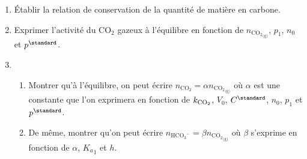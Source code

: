 \documentclass[a4paper,french,bookmarks]{article}
\begin{document}
    \begin{enumerate}
        \item Établir la relation de conservation de la quantité de matière en carbone.
        
        \boxansconc{
            \[ n_0 = n_{{\mathrm C\mathrm O_2}_\text{(g)}} + n_{{\mathrm C\mathrm O_2}} + n_{{\mathrm H\mathrm C\mathrm O_3}^-} + n_{{\mathrm C\mathrm O_3}^{2-}}\]
        }
        
        \item Exprimer l'activité du $\mathrm C\mathrm O_2$ gazeux à l'équilibre en fonction de $n_{{\mathrm C\mathrm O_2}_\text{(g)}}$, $p_1$, $n_0$ et $p^\standard$.
        
        
        \item \begin{enumerate}
            \item Montrer qu'à l'équilibre, on peut écrire $n_{\mathrm C\mathrm O_2} = \alpha n_{{\mathrm C\mathrm O_2}_\text{(g)}}$ où $\alpha$ est une constante que l'on exprimera en fonction de $k_{\textrm C\textrm O_2}$, $V_0$, $C^\standard$, $n_0$, $p_1$ et $p^\standard$.
            
            
            \item De même, montrer qu'on peut écrire $n_{{\mathrm H\mathrm C\mathrm O_3}^-} = \beta n_{{\mathrm C\mathrm O_2}_\text{(g)}} $ où $\beta$ s'exprime en fonction de $\alpha$, ${K_a}_1$ et $h$.
            
            

\end{enumerate}
\end{enumerate}
\end{document}
